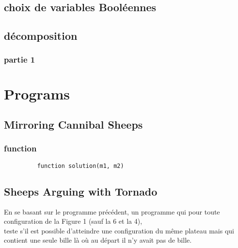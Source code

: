 \documentclass[utf8]{article}
\begin{document}
\subsection{choix de variables Booléennes}


\subsection{décomposition}
\subsubsection{partie 1}




\newpage

\section{Programs}

\subsection{ Mirroring Cannibal Sheeps }

\subsubsection{function}

\begin{figure}[H]
\begin{minipage}{\textwidth}
  \centering	
	\begin{lstlisting}
	function solution(m1, m2) 
    \end{lstlisting}
  \label{fig:code_exemple}
\end{minipage}
\end{figure}




\subsection{ Sheeps Arguing with Tornado }
En se basant sur le programme précédent, 
un programme qui pour toute configuration de la Figure 1 (sauf la 6 et la
4), \\
teste s’il est possible d’atteindre une configuration du même plateau
mais qui contient une seule bille là où au départ il n’y avait pas de bille.\\
\end{document}
